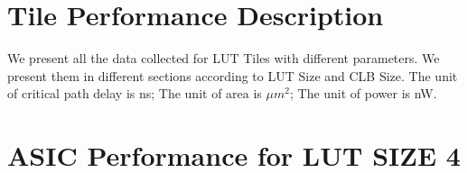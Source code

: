 \section{Tile Performance Description}
\label{sec:tile_perf_dess}

We present all the data collected for LUT Tiles with different parameters. We present
them in different sections according to LUT Size and CLB Size. The unit of critical path
delay is ns; The unit of area is $\mu m^{2}$; The unit of power is nW. \par

\clearpage

\section{ASIC Performance for LUT SIZE 4}
\label{sec:tile-perf-lut-4}

